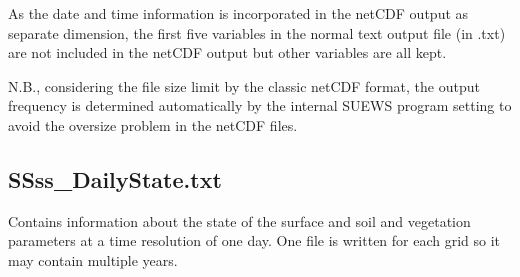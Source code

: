 \documentclass[letterpaper,10pt,english]{sphinxmanual}
\begin{document}
As the date and time information is incorporated in the netCDF output as
separate dimension, the first five variables in the normal text output
file (in .txt) are not included in the netCDF output but other variables
are all kept.

N.B., considering the file size limit by the classic netCDF format, the
output frequency is determined automatically by the internal SUEWS
program setting to avoid the oversize problem in the netCDF files.


\subsection{SSss\_DailyState.txt}
\label{\detokenize{output-files:ssss-dailystate-txt}}
Contains information about the state of the surface and soil and
vegetation parameters at a time resolution of one day. One file is
written for each grid so it may contain multiple years.
\end{document}
